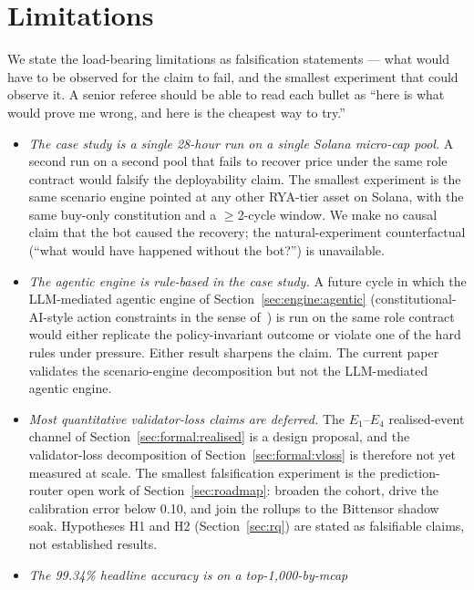 \documentclass[11pt,a4paper]{article}
\begin{document}
\section{Limitations}\label{sec:limitations}

We state the load-bearing limitations as falsification statements --- what
would have to be observed for the claim to fail, and the smallest experiment
that could observe it. A senior referee should be able to read each bullet as
``here is what would prove me wrong, and here is the cheapest way to try.''

\begin{itemize}
  \item \emph{The case study is a single 28-hour run on a single Solana
        micro-cap pool.} A second run on a second pool that fails to recover
        price under the same role contract would falsify the deployability
        claim. The smallest experiment is the same scenario engine pointed at
        any other RYA-tier asset on Solana, with the same buy-only constitution
        and a $\geq$2-cycle window. We make no causal claim that the bot caused
        the recovery; the natural-experiment counterfactual (``what would have
        happened without the bot?'') is unavailable.
  \item \emph{The agentic engine is rule-based in the case study.} A future
        cycle in which the LLM-mediated agentic engine of
        Section~\ref{sec:engine:agentic} (constitutional-AI-style action
        constraints in the sense of~\cite{bai2022constitutional}) is run on the
        same role contract would either replicate the policy-invariant outcome
        or violate one of the hard rules under pressure. Either result
        sharpens the claim. The current paper validates the scenario-engine
        decomposition but not the LLM-mediated agentic engine.
  \item \emph{Most quantitative validator-loss claims are deferred.} The
        $E_1$--$E_4$ realised-event channel of Section~\ref{sec:formal:realised}
        is a design proposal, and the validator-loss decomposition of
        Section~\ref{sec:formal:vloss} is therefore not yet measured at scale.
        The smallest falsification experiment is the prediction-router open
        work of Section~\ref{sec:roadmap}: broaden the cohort, drive the
        calibration error below 0.10, and join the rollups to the Bittensor
        shadow soak. Hypotheses H1 and H2 (Section~\ref{sec:rq}) are stated as
        falsifiable claims, not established results.
  \item \emph{The 99.34\% headline accuracy is on a top-1{,}000-by-mcap
}
\end{itemize}
\end{document}
